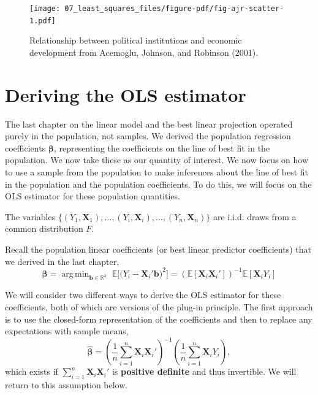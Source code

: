 \documentclass[
  letterpaper,
  DIV=11,
  numbers=noendperiod]{scrreprt}
\newcommand{\mb}{\symbf}
\newcommand{\E}{\mathbb{E}}
\newcommand{\real}{\mathbb{R}}
\newcommand{\X}{\mb{X}}
\newcommand{\bfbeta}{\mb{\beta}}
\newcommand{\bhat}{\widehat{\mb{\beta}}}
\DeclareMathOperator*{\argmin}{arg\,min}
\theoremstyle{plain}
\theoremstyle{definition}
\theoremstyle{definition}
\theoremstyle{remark}
\begin{document}
\begin{figure}[th]

{\centering \texttt{[image: 07\_least\_squares\_files/figure-pdf/fig-ajr-scatter-1.pdf]}

}

\caption{\label{fig-ajr-scatter}Relationship between political
institutions and economic development from Acemoglu, Johnson, and
Robinson (2001).}

\end{figure}

\hypertarget{deriving-the-ols-estimator}{%
\section{Deriving the OLS estimator}\label{deriving-the-ols-estimator}}

The last chapter on the linear model and the best linear projection
operated purely in the population, not samples. We derived the
population regression coefficients \(\bfbeta\), representing the
coefficients on the line of best fit in the population. We now take
these as our quantity of interest. We now focus on how to use a sample
from the population to make inferences about the line of best fit in the
population and the population coefficients. To do this, we will focus on
the OLS estimator for these population quantities.

\begin{tcolorbox}[enhanced jigsaw, opacityback=0, breakable, bottomtitle=1mm, opacitybacktitle=0.6, coltitle=black, leftrule=.75mm, toptitle=1mm, colback=white, titlerule=0mm, colframe=quarto-callout-note-color-frame, rightrule=.15mm, bottomrule=.15mm, toprule=.15mm, title=\textcolor{quarto-callout-note-color}{\faInfo}\hspace{0.5em}{Assumption}, left=2mm, arc=.35mm, colbacktitle=quarto-callout-note-color!10!white]

The variables
\(\{(Y_1, \X_1), \ldots, (Y_i,\X_i), \ldots, (Y_n, \X_n)\}\) are i.i.d.
draws from a common distribution \(F\).

\end{tcolorbox}

Recall the population linear coefficients (or best linear predictor
coefficients) that we derived in the last chapter, \[ 
\bfbeta = \argmin_{\mb{b} \in \real^k}\; \E\bigl[ \bigl(Y_{i} - \mb{X}_{i}'\mb{b} \bigr)^2\bigr] = \left(\E[\X_{i}\X_{i}']\right)^{-1}\E[\X_{i}Y_{i}]
\]

We will consider two different ways to derive the OLS estimator for
these coefficients, both of which are versions of the plug-in principle.
The first approach is to use the closed-form representation of the
coefficients and then to replace any expectations with sample means, \[ 
\bhat = \left(\frac{1}{n} \sum_{i=1}^n \X_i\X_i' \right)^{-1} \left(\frac{1}{n} \sum_{i=1}^n \X_{i}Y_{i} \right),
\] which exists if \(\sum_{i=1}^n \X_i\X_i'\) is \textbf{positive
definite} and thus invertible. We will return to this assumption below.
\end{document}
